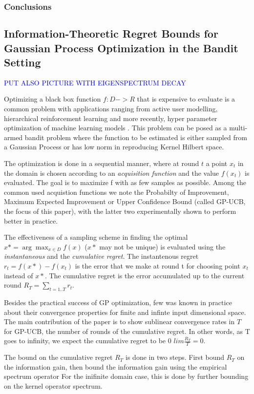 \documentclass[10pt,journal,a4paper]{IEEEtran}
\begin{document}
\subsubsection{Conclusions}

\subsection{Information-Theoretic Regret Bounds for Gaussian Process Optimization in the Bandit Setting}
\textcolor{blue}{ PUT ALSO PICTURE WITH EIGENSPECTRUM DECAY
}

Optimizing a black box function $f: D->R$ that is expensive to evaluate is a common problem with applications ranging from active user modelling, hierarchical reinforcement learning\cite{BPtutorial} and more recently, hyper parameter optimization of machine learning models \cite{hyperparameter}. This problem can be posed as a multi-armed bandit problem where the function to be estimated is either sampled from a Gaussian Process or has low norm in reproducing Kernel Hilbert space.

The optimization is done in a sequential manner, where at round $t$ a point $x_t$ in the domain is chosen according to an \textit{acquisition function} and the value $f(x_t)$ is evaluated. The goal is to maximize f with as few samples as possible. Among the common used acquistion functions we note the Probabilty of Improvement, Maximum Expected Improvement or Upper Confidence Bound (called GP-UCB, the focus of this paper), with the latter two experimentally shown to perform better in practice. 

The effectiveness of a sampling scheme in finding the optimal $x* = \arg\max_{x\in D}f(x)$ ($x*$  may not be unique) is evaluated using the \textit{instantaneous} and the 
\textit{cumulative regret}.  The instantenous regret $r_t = f(x*) - f(x_t)$ is the error that we make at round t for choosing point $x_t$ instead of $x*$. The cumulative regret is the error accumulated up to the current round $R_T = \sum_{t=1..T} r_t$.

Besides the practical success of GP optimization, few was known in practice about their convergence properties for finite and infinte input dimensional space. The main contribution of the paper is to show sublinear convergence rates in $T$ for GP-UCB, the number of rounds of the cumulative regret. In other words, as T goes to infinity, we expect the cumulative regret to be 0 $lim \frac{R_T}{T} = 0$.

The bound on the cumulative regret $R_T$ is done in two steps. First  bound $R_T$ on the information gain, then bound the information gain using the empirical spectrum operator For the inifinite domain case, this is done by further bounding on the kernel operator spectrum.
\end{document}
